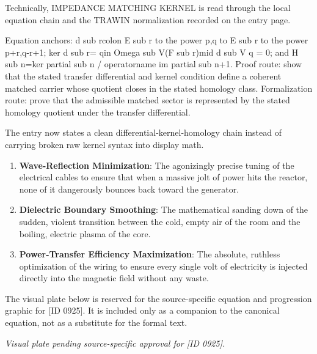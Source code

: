 Technically, IMPEDANCE MATCHING KERNEL is read through the local equation chain and the TRAWIN normalization recorded on the entry page.

Equation anchors: d sub rcolon E sub r to the power p,q to E sub r to the power p+r,q-r+1; ker d sub r= qin Omega sub V(F sub r)mid d sub V q = 0; and H sub n=ker partial sub n / operatorname im partial sub n+1. Proof route: show that the stated transfer differential and kernel condition define a coherent matched carrier whose quotient closes in the stated homology class. Formalization route: prove that the admissible matched sector is represented by the stated homology quotient under the transfer differential.

The entry now states a clean differential-kernel-homology chain instead of carrying broken raw kernel syntax into display math.
\endgroup

\begin{enumerate}[leftmargin=1.6em,itemsep=6pt,topsep=4pt]
\item \textbf{Wave-Reflection Minimization}: The agonizingly precise tuning of the electrical cables to ensure that when a massive jolt of power hits the reactor, none of it dangerously bounces back toward the generator.
\item \textbf{Dielectric Boundary Smoothing}: The mathematical sanding down of the sudden, violent transition between the cold, empty air of the room and the boiling, electric plasma of the core.
\item \textbf{Power-Transfer Efficiency Maximization}: The absolute, ruthless optimization of the wiring to ensure every single volt of electricity is injected directly into the magnetic field without any waste.
\end{enumerate}

\begingroup\footnotesize\sloppy
The visual plate below is reserved for the source-specific equation and progression graphic for [ID 0925]. It is included only as a companion to the canonical equation, not as a substitute for the formal text.
\par\endgroup
\begingroup\footnotesize\itshape
Visual plate pending source-specific approval for [ID 0925].
\par\endgroup

